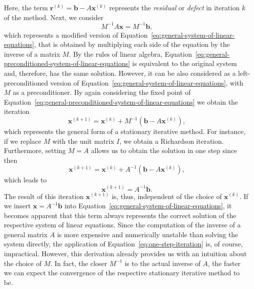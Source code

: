 Here, the term $\bm{r}^{(k)} = \bm{b} - A \bm{x}^{(k)}$ represents the \emph{residual} or \emph{defect} in iteration $k$ of the method.
Next, we consider 
\begin{equation}
	M^{-1} A \bm{x} = M^{-1} \bm{b},
	\label{eq:general-preconditioned-system-of-linear-equations}
\end{equation}
which represents a modified version of Equation~\eqref{eq:general-system-of-linear-equations}, that is obtained by multiplying each side of the equation by the inverse of a matrix $M$.
By the rules of linear algebra, Equation~\eqref{eq:general-preconditioned-system-of-linear-equations} is equivalent to the original system and, therefore, has the same solution.
However, it can be also considered as a left-preconditioned version of Equation~\eqref{eq:general-system-of-linear-equations}, with $M$ as a preconditioner.
By again considering the fixed point of Equation~\eqref{eq:general-preconditioned-system-of-linear-equations} we obtain the iteration
\begin{equation}
	\bm{x}^{(k+1)} = \bm{x}^{(k)} + M^{-1}(\bm b - A \bm{x}^{(k)}),
	\label{eq:general-stationary-iterative-method}
\end{equation}
which represents the general form of a stationary iterative method. 
For instance, if we replace $M$ with the unit matrix $I$, we obtain a Richardson iteration.
Furthermore, setting $M = A$ allows us to obtain the solution in one step since then
\begin{equation}
	\bm{x}^{(k+1)} = \bm{x}^{(k)} + A^{-1}(\bm b - A \bm{x}^{(k)}),
	\label{eq:one-step-iteration}
\end{equation}
which leads to
\begin{equation}
	\bm{x}^{(k+1)} = A^{-1}\bm b.
\end{equation}
The result of this iteration $\bm{x}^{(k+1)}$ is, thus, independent of the choice of $\bm{x}^{(k)}$. 
If we insert $\bm{x} = A^{-1}\bm b$ into Equation~\eqref{eq:general-system-of-linear-equations}, it becomes apparent that this term always represents the correct solution of the respective system of linear equations.
Since the computation of the inverse of a general matrix $A$ is more expensive and numerically unstable than solving the system directly, the application of Equation~\eqref{eq:one-step-iteration} is, of course, impractical.
However, this derivation already provides us with an intuition about the choice of $M$.
In fact, the closer $M^{-1}$ is to the actual inverse of $A$, the faster we can expect the convergence of the respective stationary iterative method to be.
